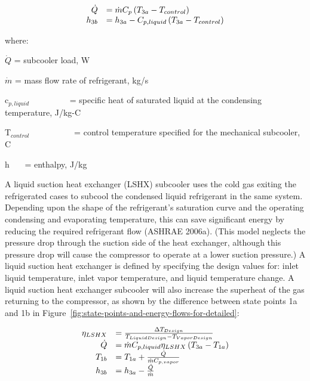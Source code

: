 \begin{equation}
  \begin{array}{rl}
    \dot{Q} &= \dot{m} C_p \PB{T_{3a} - T_{control}} \\
    h_{3b}  &= h_{3a} - C_{p,liquid} \PB{T_{3a} - T_{control}}
  \end{array}
\end{equation}

where:

\(\dot Q\) = subcooler load, W

\(\dot m\) = mass flow rate of refrigerant, kg/s

c\(_{p,liquid}\)~~~~~~~~~ = specific heat of saturated liquid at the condensing temperature, J/kg-C

T\(_{control}\)~~~~~~~~~~ = control temperature specified for the mechanical subcooler, C

h~~~ = enthalpy, J/kg

A liquid suction heat exchanger (LSHX) subcooler uses the cold gas exiting the refrigerated cases to subcool the condensed liquid refrigerant in the same system. Depending upon the shape of the refrigerant's saturation curve and the operating condensing and evaporating temperature, this can save significant energy by reducing the required refrigerant flow (ASHRAE 2006a). (This model neglects the pressure drop through the suction side of the heat exchanger, although this pressure drop will cause the compressor to operate at a lower suction pressure.) A liquid suction heat exchanger is defined by specifying the design values for: inlet liquid temperature, inlet vapor temperature, and liquid temperature change. A liquid suction heat exchanger subcooler will also increase the superheat of the gas returning to the compressor, as shown by the difference between state points 1a and 1b in Figure~\ref{fig:state-points-and-energy-flows-for-detailed}:

\begin{equation}
  \begin{array}{rl}
    \eta_{LSHX} &= \frac{\Delta T_{Design}}{T_{Liquid Design} - T_{Vapor Design}} \\
    \dot{Q} &= \dot{m} C_{p,liquid} \eta_{LSHX} \PB{T_{3a} - T_{1a}} \\
    T_{1b} &= T_{1a} + \frac{\dot{Q}}{\dot{m}C_{p,vapor}} \\
    h_{3b} &= h_{3a} - \frac{\dot{Q}}{\dot{m}}
  \end{array}
\end{equation}

